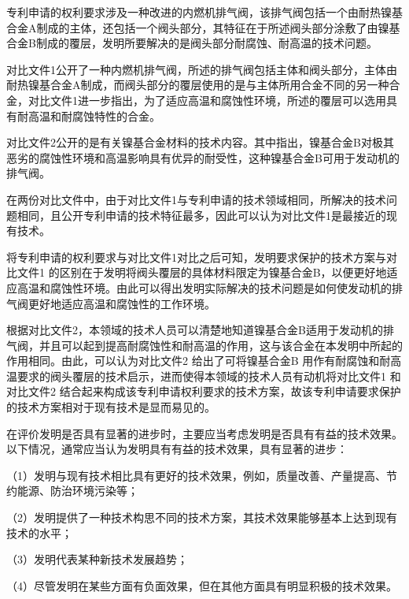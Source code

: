 专利申请的权利要求涉及一种改进的内燃机排气阀，该排气阀包括一个由耐热镍基合金A制成的主体，还包括一个阀头部分，其特征在于所述阀头部分涂敷了由镍基合金B制成的覆层，发明所要解决的是阀头部分耐腐蚀、耐高温的技术问题。

对比文件1公开了一种内燃机排气阀，所述的排气阀包括主体和阀头部分，主体由耐热镍基合金A制成，而阀头部分的覆层使用的是与主体所用合金不同的另一种合金，对比文件1进一步指出，为了适应高温和腐蚀性环境，所述的覆层可以选用具有耐高温和耐腐蚀特性的合金。

对比文件2公开的是有关镍基合金材料的技术内容。其中指出，镍基合金B对极其恶劣的腐蚀性环境和高温影响具有优异的耐受性，这种镍基合金B可用于发动机的排气阀。

在两份对比文件中，由于对比文件1与专利申请的技术领域相同，所解决的技术问题相同，且公开专利申请的技术特征最多，因此可以认为对比文件1是最接近的现有技术。

将专利申请的权利要求与对比文件1对比之后可知，发明要求保护的技术方案与对比文件1 的区别在于发明将阀头覆层的具体材料限定为镍基合金B，以便更好地适应高温和腐蚀性环境。由此可以得出发明实际解决的技术问题是如何使发动机的排气阀更好地适应高温和腐蚀性的工作环境。

根据对比文件2，本领域的技术人员可以清楚地知道镍基合金B适用于发动机的排气阀，并且可以起到提高耐腐蚀性和耐高温的作用，这与该合金在本发明中所起的作用相同。由此，可以认为对比文件2 给出了可将镍基合金B 用作有耐腐蚀和耐高温要求的阀头覆层的技术启示，进而使得本领域的技术人员有动机将对比文件1 和对比文件2 结合起来构成该专利申请权利要求的技术方案，故该专利申请要求保护的技术方案相对于现有技术是显而易见的。

在评价发明是否具有显著的进步时，主要应当考虑发明是否具有有益的技术效果。以下情况，通常应当认为发明具有有益的技术效果，具有显著的进步：

{\setlength{\parindent}{17.1bp}（1）发明与现有技术相比具有更好的技术效果，例如，质量改善、产量提高、节约能源、防治环境污染等；\par}

{\setlength{\parindent}{17.1bp}（2）发明提供了一种技术构思不同的技术方案，其技术效果能够基本上达到现有技术的水平；\par}

{\setlength{\parindent}{17.1bp}（3）发明代表某种新技术发展趋势；\par}

{\setlength{\parindent}{17.1bp}（4）尽管发明在某些方面有负面效果，但在其他方面具有明显积极的技术效果。\par}

